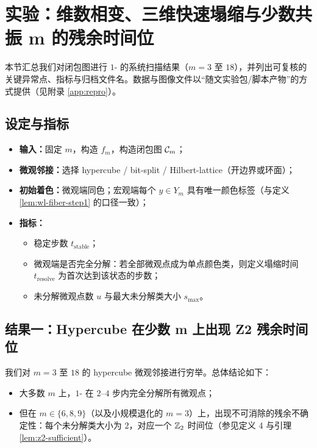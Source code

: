 
\section{实验：维数相变、三维快速塌缩与少数共振 m 的残余时间位}

本节汇总我们对闭包图进行 $1$-\WL{} 的系统扫描结果（$m=3$ 至 $18$），并列出可复核的关键异常点、指标与归档文件名。数据与图像文件以“随文实验包/脚本产物”的方式提供（见附录 \ref{app:repro}）。

\subsection{设定与指标}

\begin{itemize}
  \item \textbf{输入：}固定 $m$，构造 $f_m$，构造闭包图 $\mathcal{C}_m$；
  \item \textbf{微观邻接：}选择 hypercube / bit-split / Hilbert-lattice（开边界或环面）；
  \item \textbf{初始着色：}微观端同色；宏观端每个 $y\in Y_m$ 具有唯一颜色标签（与定义 \ref{lem:wl-fiber-step1} 的口径一致）；
  \item \textbf{\WL{} 指标：}
  \begin{itemize}
    \item 稳定步数 $t_{\mathrm{stable}}$；
    \item 微观端是否完全分解：若全部微观点成为单点颜色类，则定义塌缩时间 $t_{\mathrm{resolve}}$ 为首次达到该状态的步数；
    \item 未分解微观点数 $u$ 与最大未分解类大小 $s_{\max}$。
  \end{itemize}
\end{itemize}

\subsection{结果一：Hypercube 在少数 m 上出现 Z2 残余时间位}

我们对 $m=3$ 至 $18$ 的 hypercube 微观邻接进行穷举。总体结论如下：
\begin{itemize}
  \item 大多数 $m$ 上，$1$-\WL{} 在 $2$--$4$ 步内完全分解所有微观点；
  \item 但在 $m\in\{6,8,9\}$（以及小规模退化的 $m=3$）上，出现不可消除的残余不确定性：每个未分解类大小为 $2$，对应一个 $\mathbb{Z}_2$ 时间位（参见定义 4 与引理 \ref{lem:z2-sufficient}）。
\end{itemize}

